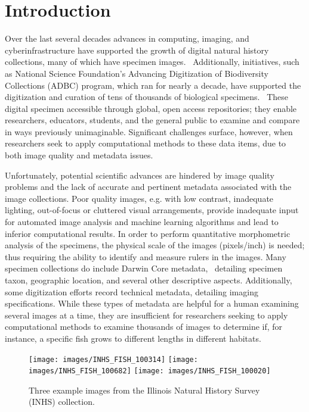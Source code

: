 \documentclass[conference]{IEEEtran}
\begin{document}
\section{Introduction}
Over the last several decades advances in computing, imaging, and cyberinfrastructure have supported the growth of digital natural history collections, many of which have specimen images.~\cite{beaman2012mass} Additionally, initiatives, such as National Science Foundation’s Advancing Digitization of Biodiversity Collections (ADBC) program, which ran for nearly a decade, have supported the digitization and curation of tens of thousands of biological specimens.~\cite{page2015digitization} These digital specimen accessible through global, open access repositories; they enable researchers, educators, students, and the general public to examine and compare in ways previously unimaginable. Significant challenges surface, however, when researchers seek to apply computational methods to these data items, due to both image quality and metadata issues.

Unfortunately, potential scientific advances are hindered by image quality
problems and the lack of accurate and pertinent metadata
associated with the image collections.
Poor quality images, e.g. with low contrast, inadequate lighting,
out-of-focus or cluttered visual arrangements, provide inadequate input
for automated
image analysis and machine learning algorithms and lead to inferior
computational results.
In order to perform quantitative morphometric analysis of the specimens,
the physical scale of the images (pixels/inch) is needed; thus
requiring the ability to identify and measure rulers in the images.
Many specimen collections do include Darwin Core metadata,~\cite{biodiv_info_standards} detailing
specimen taxon, geographic location, and several other descriptive aspects.
Additionally, some digitization efforts record technical metadata, detailing imaging specifications. While these types of metadata are helpful for a
human examining several images at a time, they are insufficient for researchers seeking to apply computational methods to examine thousands of images
to determine if, for instance, a specific fish grows to different lengths
in different habitats.
\begin{figure}
  \centering
  \texttt{[image: images/INHS\_FISH\_100314]}
  \hspace{1mm}
  \texttt{[image: images/INHS\_FISH\_100682]}
  \hspace{1mm}
  \texttt{[image: images/INHS\_FISH\_100020]}
  \caption{Three example images from the Illinois Natural History Survey (INHS) collection.}
  \label{fig:INHS_examples}
\end{figure}
\end{document}
